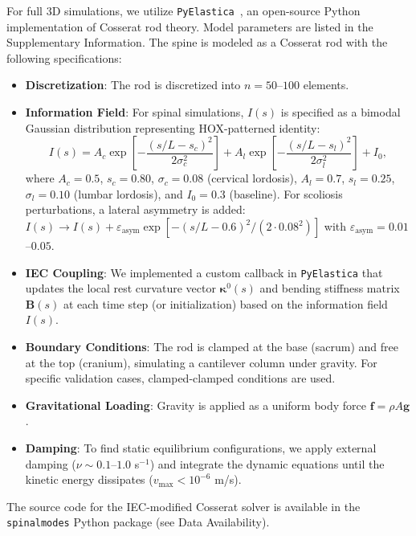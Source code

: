 \documentclass[11pt]{article}
\begin{document}
For full 3D simulations, we utilize \texttt{PyElastica}~\cite{pyelastica_zenodo,gazzola2018forward}, an open-source Python implementation of Cosserat rod theory. Model parameters are listed in the Supplementary Information. The spine is modeled as a Cosserat rod with the following specifications:

\begin{itemize}
    \item \textbf{Discretization}: The rod is discretized into $n=50$--$100$ elements.
    \item \textbf{Information Field}: For spinal simulations, $I(s)$ is specified as a bimodal Gaussian distribution representing HOX-patterned identity:
    \begin{equation}
    I(s) = A_c \exp\left[-\frac{(s/L - s_c)^2}{2\sigma_c^2}\right] + A_l \exp\left[-\frac{(s/L - s_l)^2}{2\sigma_l^2}\right] + I_0,
    \label{eq:info_field_spinal}
    \end{equation}
    where $A_c = 0.5$, $s_c = 0.80$, $\sigma_c = 0.08$ (cervical lordosis), $A_l = 0.7$, $s_l = 0.25$, $\sigma_l = 0.10$ (lumbar lordosis), and $I_0 = 0.3$ (baseline). For scoliosis perturbations, a lateral asymmetry is added: $I(s) \to I(s) + \varepsilon_{\mathrm{asym}} \exp[-(s/L - 0.6)^2/(2 \cdot 0.08^2)]$ with $\varepsilon_{\mathrm{asym}} = 0.01$--$0.05$.
    \item \textbf{IEC Coupling}: We implemented a custom callback in \texttt{PyElastica} that updates the local rest curvature vector $\bm{\kappa}^0(s)$ and bending stiffness matrix $\mathbf{B}(s)$ at each time step (or initialization) based on the information field $I(s)$.
    \item \textbf{Boundary Conditions}: The rod is clamped at the base (sacrum) and free at the top (cranium), simulating a cantilever column under gravity. For specific validation cases, clamped-clamped conditions are used.
    \item \textbf{Gravitational Loading}: Gravity is applied as a uniform body force $\mathbf{f} = \rho A \mathbf{g}$.
    \item \textbf{Damping}: To find static equilibrium configurations, we apply external damping ($\nu \sim 0.1$--$1.0$ s$^{-1}$) and integrate the dynamic equations until the kinetic energy dissipates ($v_{\max} < 10^{-6}$ m/s).
\end{itemize}

The source code for the IEC-modified Cosserat solver is available in the \texttt{spinalmodes} Python package (see Data Availability).
\end{document}
